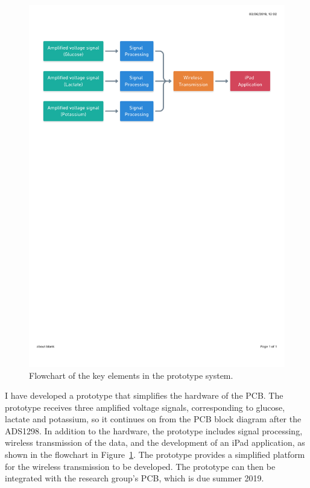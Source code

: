 \begin{figure}[b!]
\centering
\includegraphics[trim={0cm 19.5cm 0.5cm  2.5cm}, clip, width=1\textwidth]{./figures/Flowchart.pdf}
\captionsetup{justification=centering}
\caption{Flowchart of the key elements in the prototype system.}
\label{fig: flowchart}
\end{figure}

I have developed a prototype that simplifies the hardware of the PCB. The prototype receives three amplified voltage signals, corresponding to glucose, lactate and potassium, so it continues on from the PCB block diagram after the ADS1298. In addition to the hardware, the prototype includes signal processing, wireless transmission of the data, and the development of an iPad application, as shown in the flowchart in Figure~\ref{fig: flowchart}. The prototype provides a simplified platform for the wireless transmission to be developed. The prototype can then be integrated with the research group's PCB, which is due summer 2019.



